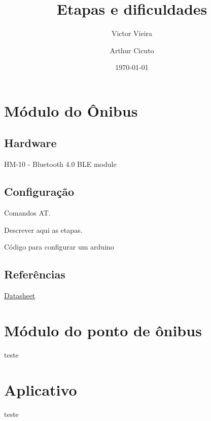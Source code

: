 \documentclass[a4paper, 12pt]{article}
\title{Etapas e dificuldades}
\author{Victor Vieira}
\author{Arthur Cicuto}
\date{\today}
\begin{document}
\maketitle

\section{Módulo do Ônibus}

\subsection{Hardware}

HM-10 - Bluetooth 4.0 BLE module

\subsection{Configuração}

Comandos AT.

Descrever aqui as etapas.

Código para configurar um arduino



\subsection{Referências}

\href{ftp://imall.iteadstudio.com/Modules/IM130614001_Serial_Port_BLE_Module_Master_Slave_HM-10/DS_IM130614001_Serial_Port_BLE_Module_Master_Slave_HM-10.pdf}{Datasheet}

\section{Módulo do ponto de ônibus}

teste

\section{Aplicativo}

teste
\end{document}
